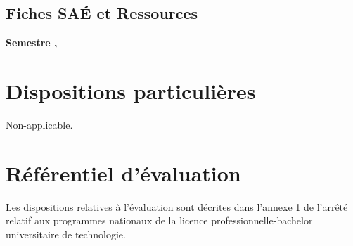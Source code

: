\documentclass[10pt]{article}
\begin{document}
\subsection{Fiches SAÉ et Ressources}

\textbf{Semestre , }\\
\par
\section{Dispositions particulières}
Non-applicable.
\section{Référentiel d’évaluation}
Les dispositions relatives à l’évaluation sont décrites dans l’annexe 1
de l’arrêté relatif aux programmes nationaux de la licence
professionnelle-bachelor universitaire de technologie.
\end{document}
